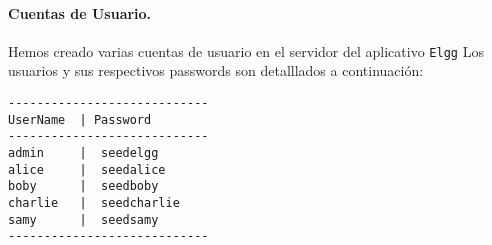 

\paragraph{Cuentas de Usuario.}
Hemos creado varias cuentas de usuario en el servidor del aplicativo {\tt Elgg}
Los usuarios y sus respectivos passwords son detalllados a continuación:


\begin{lstlisting}
----------------------------
UserName  | Password
----------------------------
admin     |  seedelgg
alice     |  seedalice 
boby      |  seedboby 
charlie   |  seedcharlie 
samy      |  seedsamy 
----------------------------
\end{lstlisting}




